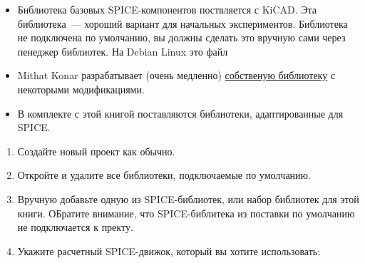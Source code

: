 
\secdown\label{kispice}


\begin{itemize}
\item Библиотека базовых SPICE-компонентов поствляется с KiCAD. Эта
библиотека\ --- хороший вариант для начальных экспериментов.
Библиотека не подключена по умолчанию, вы должны сделать это вручную сами через
пенеджер библиотек. На Debian Linux это файл\\

\item Mithat Konar  разрабатывает (очень медленно)
\href{https://bitbucket.org/mithat/kicad-spice-library}{собственую
библиотеку} с некоторыми модификациями.

\item В комплекте с этой книгой поставляются библиотеки, адаптированные для
SPICE.

\end{itemize}


\begin{enumerate}
\item Создайте новый проект как обычно.
\item Откройте  и удалите все библиотеки, подключаемые по
умолчанию.
\item Вручную добавьте одную из SPICE-библиотек, или набор библиотек для
этой книги. ОБратите внимание, что SPICE-библитека из поставки 
по умолчанию не подключается к пректу.
\item Укажите расчетный SPICE-движок, который вы хотите использовать:







\end{enumerate}


